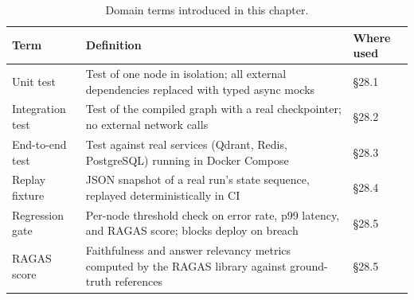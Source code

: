 \begin{table}[htbp]
\centering
\caption{Domain terms introduced in this chapter.}
\label{tab:ch28-terms}
\begin{tabularx}{\linewidth}{@{} l P{5cm} P{5.5cm} @{}}
\toprule
\textbf{Term} & \textbf{Definition} & \textbf{Where used} \\
\midrule
Unit test       & Test of one node in isolation; all external dependencies replaced with typed async mocks & \S28.1 \\
Integration test & Test of the compiled graph with a real checkpointer; no external network calls & \S28.2 \\
End-to-end test  & Test against real services (Qdrant, Redis, PostgreSQL) running in Docker Compose & \S28.3 \\
Replay fixture   & JSON snapshot of a real run's state sequence, replayed deterministically in CI & \S28.4 \\
Regression gate  & Per-node threshold check on error rate, p99 latency, and RAGAS score; blocks deploy on breach & \S28.5 \\
RAGAS score      & Faithfulness and answer relevancy metrics computed by the RAGAS library against ground-truth references & \S28.5 \\
\bottomrule
\end{tabularx}
\end{table}

\begin{sourcelayout}


\end{sourcelayout}

